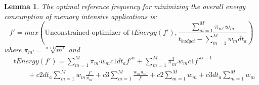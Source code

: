 \documentclass[11pt, letterpaper]{article}
\newtheorem{lemma}{Lemma}
\begin{document}
\begin{lemma}\label{TotalOptimizer}
The optimal reference frequency for minimizing the overall energy consumption of memory intensive applications  is:
\begin{displaymath}
f' = max(\text{Unconstrained optimizer of }  tEnergy(f'),  \frac{\sum_{m=1}^{M}\pi_{m'}w_m}{t_{budget} - \sum_{m=1}^{M}w_mdt_a})
\end{displaymath}
where $\pi_{m'} =\sqrt[\alpha+1]{m'}$ and \\
\begin{displaymath}
\begin{aligned}
 &tEnergy(f') = \sum_{m=1}^{M}\pi_{m'}w_m c1dt_af'^{\alpha} + \sum_{m=1}^{M}\pi_{m'}^2 w_m c1f'^{\alpha-1} \\
& \qquad + c2dt_a\sum_{m=1}^{M} w_m \frac{f'}{\pi_{m'}}  +  c3\sum_{m=1}^{M}\frac{w_m\pi_{m'}}{f'}  + c2\sum_{m=1}^{M}w_m + c3dt_a\sum_{m=1}^{M}w_m
 \end{aligned}
 \end{displaymath}
\end{lemma}
\end{document}

